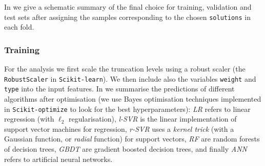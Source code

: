 In  we give a schematic summary of the final choice for training, validation and test sets after assigning the samples corresponding to the chosen \texttt{solutions} in each fold. 


\subsubsection{Training}

For the \ml analysis we first scale the truncation levels using a robust scaler (the \texttt{RobustScaler} in \texttt{Scikit-learn}).
We then include also the variables \texttt{weight} and \texttt{type} into the input features.
In  we summarise the predictions of different algorithms after optimisation (we use Bayes optimisation techniques implemented in \texttt{Scikit-optimize} to look for the best hyperparameters): \emph{LR} refers to linear regression (with $\ell_2$ regularisation), \emph{l-SVR} is the linear implementation of support vector machines for regression, \emph{r-SVR} uses a \emph{kernel trick} (with a Gaussian function, or \emph{radial} function) for support vectors, \emph{RF} are random forests of decision trees, \emph{GBDT} are gradient boosted decision trees, and finally \emph{ANN} refers to artificial neural networks.\footnotemark{}

